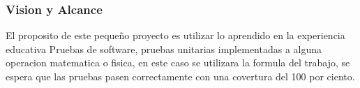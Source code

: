 \begin{frame}
\titlepage 

\end{frame}

\begin{frame}
\frametitle{Vision y Alcance} 
El proposito de este pequeño proyecto es utilizar lo aprendido en la experiencia educativa  Pruebas de software, pruebas unitarias implementadas a alguna operacion matematica o fisica, en este caso se utilizara la formula del trabajo, se espera que las pruebas pasen correctamente con una covertura del 100 por ciento.

\tableofcontents 
\end{frame}

